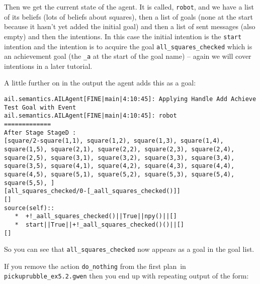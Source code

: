 Then we get the current state of the agent.  It is called,
\texttt{robot}, and we have a list of its beliefs (lots
of beliefs about squares), then a list of goals (none at
the start because it hasn't yet added the initial
goal) and then a list of sent
messages (also
empty) and then the intentions.  In this case the
initial intention is the \texttt{start}
intention and the intention is to acquire the
goal \texttt{all\_squares\_checked} which is an achievement goal (the
\texttt{\_a} at the start of the goal name) -- again we will cover
intentions in a later tutorial. 

A little further on in the output the agent adds this as a goal:
\begin{verbatim}
ail.semantics.AILAgent[FINE|main|4:10:45]: Applying Handle Add Achieve Test Goal with Event 
ail.semantics.AILAgent[FINE|main|4:10:45]: robot
=============
After Stage StageD :
[square/2-square(1,1), square(1,2), square(1,3), square(1,4), square(1,5), square(2,1), square(2,2), square(2,3), square(2,4), square(2,5), square(3,1), square(3,2), square(3,3), square(3,4), square(3,5), square(4,1), square(4,2), square(4,3), square(4,4), square(4,5), square(5,1), square(5,2), square(5,3), square(5,4), square(5,5), ]
[all_squares_checked/0-[_aall_squares_checked()]]
[]
source(self):: 
   *  +!_aall_squares_checked()||True||npy()||[]
   *  start||True||+!_aall_squares_checked()()||[]
[] 
\end{verbatim}
So you can see that \texttt{all\_squares\_checked} now appears as a goal in the goal list. 

\begin{sloppypar}
If you remove the action \texttt{do\_nothing} from the first plan\ in
\texttt{pickuprubble\_ex5.2.gwen} then you
end up with repeating output of the form: 
\end{sloppypar}

